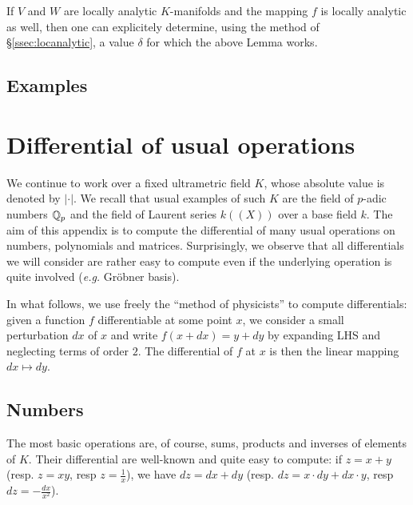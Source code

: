 \documentclass{lms}
\begin{document}
\begin{rmk}
If $V$ and $W$ are locally analytic $K$-manifolds and the mapping $f$ is 
locally analytic as well, then one can explicitely determine, using the 
method of \S \ref{ssec:locanalytic}, a value $\delta$ for which the 
above Lemma works.
\end{rmk}

\subsection{Examples}


\section{Differential of usual operations}
\label{ssec:differentials}

We continue to work over a fixed ultrametric field $K$, whose absolute 
value is denoted by $|\cdot|$. We recall that usual examples of such $K$ 
are the field of $p$-adic numbers $\mathbb Q_p$ and the field of Laurent series 
$k((X))$ over a base field $k$. The aim of this appendix is to compute 
the differential of many usual operations on numbers, polynomials and 
matrices. Surprisingly, we observe that all differentials we will 
consider are rather easy to compute even if the underlying operation is 
quite involved (\emph{e.g.} Gr\"obner basis).

In what follows, we use freely the ``method of physicists'' to compute 
differentials: given a function $f$ differentiable at some point $x$, we 
consider a small perturbation $dx$ of $x$ and write $f(x+dx) = y + dy$ 
by expanding LHS and neglecting terms of order $2$. The differential of 
$f$ at $x$ is then the linear mapping $dx \mapsto dy$.

\subsection{Numbers}

The most basic operations are, of course, sums, products and inverses of 
elements of $K$. Their differential are well-known and quite easy to 
compute: if $z = x + y$ (resp. $z = xy$, resp $z = \frac 1 x$), we have 
$dz = dx + dy$ (resp. $dz = x \cdot dy + dx \cdot y$, resp $dz = - 
\frac{dx}{x^2}$).
\end{document}
